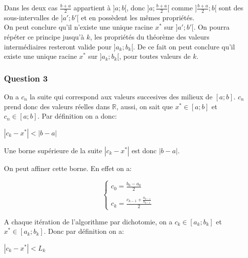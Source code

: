 \documentclass{article}
\begin{document}
	Dans les deux cas $\frac{b+a}{2}$ appartient à $]a; b[$, donc $]a; \frac{b+a}{2}[$ comme $]\frac{b+a}{2}; b[$ sont des sous-intervalles de $]a';b'[$ et en possèdent les mêmes propriétés.\\
	
	On peut conclure qu'il n'existe une unique racine $x^{*}$ sur $]a'; b'[$.
	On pourra répéter ce principe jusqu'à $k$, les propriétés du théorème des valeurs intermédiaires resteront valide pour $]a_{k}; b_{k}[$. De ce fait on peut conclure qu'il existe une unique racine $x^{*}$ sur $]a_{k}; b_{k}[$, pour toutes valeurs de $k$.
	
	\subsubsection{Question 3}
	
	On a $c_{n}$ la suite qui correspond aux valeurs succesives des milieux de $[a; b]$.
	$c_{n}$ prend donc des valeurs réelles dans $\mathbb{R}$, aussi, on sait que $x^{*} \in [a; b]$ et $c_{n} \in [a; b]$. Par définition on a donc:
	
	\begin{center}
		\begin{large}
			$|c_{k}-x^{*}| < |b-a|$
		\end{large}
	\end{center}

	Une borne supérieure de la suite $|c_{k}-x^{*}|$ est donc $|b-a|$.
	
	On peut affiner cette borne. En effet on a:
	
	\begin{large}
		$$
		\left\{
			\begin{array}{ll}
				c_{0}= \frac{b_{0}-a_{0}}{2} \\ \\
				c_{k}= \frac{c_{k-1}+\frac{a_{k-1}}{b_{k-1}}}{2}
			\end{array}
		\right.
		$$
	\end{large}
	
	\newpage	
	
	A chaque itération de l'algorithme par dichotomie, on a $c_{k} \in [a_{k}; b_{k}]$ et
	$x^{*} \in [a_{k}; b_{k}]$. Donc par définition on a:
	
	\begin{center}
		\begin{large}
			$|c_{k}-x^{*}| < L_{k}$
		\end{large}
	\end{center}
\end{document}
